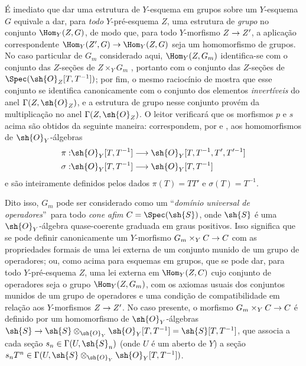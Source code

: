 \documentclass[oneside,10pt]{amsart}
\makeatletter
\newcommand{\ega@arrow}[2]{\mathchoice{#1}{#2}{#2}{#2}}
\renewcommand{\to}{\ega@arrow{\longrightarrow}{\rightarrow}}
\newcommand{\oldpage}[2][]{\marginnote{\normalfont\footnotesize\textbf{#1}~|~#2}\ignorespaces}
\makeatother
\begin{document}
\begin{remark}[8.3.9]
\oldpage[II]{167}
É imediato  que dar uma estrutura de $Y$-esquema em grupos sobre um $Y$-esquema $G$ equivale a dar, para \emph{todo} $Y$-pré-esquema $Z$, uma estrutura de \emph{grupo} no conjunto $\Hom_Y(Z,G)$, de modo que, para todo $Y$-morfismo $Z\to Z'$, a aplicação correspondente $\Hom_Y(Z',G)\to\Hom_Y(Z,G)$ seja um homomorfismo de grupos.
No caso particular de $G_m$ considerado aqui, $\Hom_Y(Z,G_m)$ identifica-se com o conjunto das $Z$-seções de $Z\times_Y G_m$ , portanto com o conjunto das $Z$-seções de $\Spec(\sh{O}_Z[T,T^{-1}])$;
por fim, o mesmo raciocínio de  mostra que esse conjunto se identifica canonicamente com o conjunto dos elementos \emph{invertíveis} do anel $\Gamma(Z,\sh{O}_Z)$, e a estrutura de grupo nesse conjunto provém da multiplicação no anel $\Gamma(Z,\sh{O}_Z)$.
O leitor verificará que os morfismos $p$ e $s$ acima são obtidos da seguinte maneira: correspondem, por  e , aos homomorfismos de $\sh{O}_Y$-álgebras
\begin{align*}
  \pi: &\sh{O}_Y[T,T^{-1}] \to \sh{O}_Y[T,T^{-1},T',T'^{-1}]
\\\sigma: &\sh{O}_Y[T,T^{-1}] \to \sh{O}_Y[T,T^{-1}]
\end{align*}
e são inteiramente definidos pelos dados $\pi(T)=TT'$ e $\sigma(T)=T^{-1}$.

Dito isso, $G_m$ pode ser considerado como um \textquotedblleft\emph{domínio universal de operadores}\textquotedblright\ para todo \emph{cone afim} $C=\Spec(\sh{S})$, onde $\sh{S}$ é uma $\sh{O}_Y$-álgebra quase-coerente graduada em graus positivos.
Isso significa que se pode definir canonicamente um $Y$-morfismo $G_m\times_Y C\to C$ com as propriedades formais de uma lei externa de um conjunto munido de um grupo de operadores;
ou, como acima para esquemas em grupos, que se pode dar, para todo $Y$-pré-esquema $Z$, uma lei externa em $\Hom_Y(Z,C)$ cujo conjunto de operadores seja o grupo $\Hom_Y(Z,G_m)$, com os axiomas usuais dos conjuntos munidos de um grupo de operadores e uma condição de compatibilidade em relação aos $Y$-morfismos $Z\to Z'$.
No caso presente, o morfismo $G_m\times_Y C\to C$ é definido por um homomorfismo de $\sh{O}_Y$-álgebras $\sh{S} \to \sh{S}\otimes_{\sh{O}_Y}\sh{O}_Y[T,T^{-1}] = \sh{S}[T,T^{-1}]$, que associa a cada seção $s_n\in\Gamma(U,\sh{S}_n)$ (onde $U$ é um aberto de $Y$) a seção $s_n T^n\in\Gamma(U,\sh{S}\otimes_{\sh{O}_Y}\sh{O}_Y[T,T^{-1}])$.


\end{remark}
\end{document}
